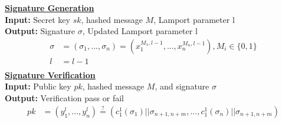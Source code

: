 \documentclass[]{scrartcl}
\makeatletter
\newcommand{\mathcenter}{\@fleqnfalse}
\makeatother
\begin{document}
\textbf{\underline{Signature Generation}}\\
\textbf{Input:} Secret key $sk$, hashed message $M$, Lamport parameter l \\
\textbf{Output:} Signature $\sigma$, Updated Lamport parameter l
\mathcenter
\begin{equation}
\begin{split}
\sigma & = (\sigma_1,...,\sigma_n)= (x^{M_1,l-1}_1, ..., x^{M_n,l-1}_n), M_i \in \{0,1\} \\
l & = l - 1 \\
\end{split}
\end{equation}
\textbf{\underline{Signature Verification}}\\
\textbf{Input:} Public key $pk$, hashed message $M$, and signature $\sigma$\\
\textbf{Output:} Verification pass or fail
\mathcenter
\begin{equation}
\begin{split}
pk & = (y^l_1,...,y^l_n) \stackrel{?}{=}(c^1_1(\sigma_{1})||\sigma_{n+1,n+m},...,c^1_1(\sigma_{n})||\sigma_{n+1,n+m})
\end{split}
\end{equation}
\end{document}
